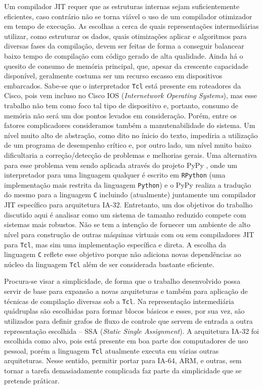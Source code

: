 Um compilador JIT requer que as estruturas internas sejam
suficientemente eficientes, caso contrário não se torna viável o
uso de um compilador otimizador em tempo de execução. As escolhas a
cerca de quais representações intermediárias utilizar, como estruturar
os dados, quais otimizações aplicar e algoritmos para diversas fases da
compilação, devem ser feitas de forma a conseguir balancear baixo
tempo de compilação com código gerado de alta qualidade. Ainda há o
quesito de consumo de memória principal, que, apesar da crescente
capacidade disponível, geralmente costuma ser um recurso escasso em
dispositivos embarcados. Sabe-se que o interpretador \texttt{Tcl} está
presente em roteadores da Cisco, pois vem incluso no Cisco IOS
(\textit{Internetwork Operating Systems}), mas esse trabalho
não tem como foco tal tipo de dispositivo e, portanto, consumo de
memória não será um dos pontos levados em consideração. Porém, entre
os fatores complicadores consideramos também a manutenabilidade do
sistema. Um nível muito alto de abstração, como dito no ínicio do
texto, impediria a utilização de um programa de desempenho crítico e,
por outro lado, um nível muito baixo dificultaria a correção/detecção de
problemas e melhorias gerais.
Uma alternativa para esse problema vem sendo aplicada através do
projeto PyPy \cite{pypy}, onde um interpretador para uma linguagem
qualquer é escrito em \texttt{RPython} (uma implementação mais
restrita da linguagem \texttt{Python}) e o PyPy realiza a tradução do
mesmo para a
linguagem \texttt{C} incluindo (atualmente) juntamente um compilador
JIT específico para arquitetura IA-32. Entretanto, um
dos objetivos do trabalho discutido aqui é analisar como um sistema de
tamanho reduzido compete com sistemas mais robustos. Não se tem a
intenção de fornecer um ambiente de alto nível para construção de
outras máquinas virtuais com ou sem compiladores JIT para
\texttt{Tcl}, mas sim uma implementação específica e direta.
A escolha da
linguagem \texttt{C} reflete esse objetivo porque não adiciona novas
dependências ao núcleo da linguagem \texttt{Tcl} além de ser
considerada bastante eficiente.

Procura-se visar a simplicidade, de forma que o trabalho desenvolvido
possa servir de base para expansão a novas arquiteturas e também para
aplicação de técnicas de compilação diversas sob a
\texttt{Tcl}. Na representação intermediária quádruplas são
escolhidas para formar blocos básicos e
esses, por sua vez, são utilizados para definir grafos de fluxo de
controle que servem de entrada a outra representação escolhida -- SSA
(\textit{Static Single Assignment}). A arquitetura IA-32 foi escolhida
como alvo, pois está presente em boa parte dos computadores de uso
pessoal, porém a linguagem \texttt{Tcl} atualmente executa em várias
outras arquiteturas. Nesse sentido, permitir portar para IA-64, ARM, e
outras, sem tornar a tarefa demasiadamente complicada faz parte da
simplicidade que se pretende práticar.

